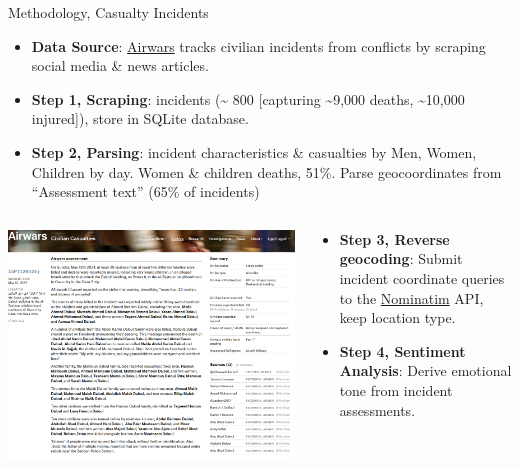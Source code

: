 \documentclass[
  ignorenonframetext,
]{beamer}
\providecommand{\tightlist}{%
  \setlength{\itemsep}{0pt}\setlength{\parskip}{0pt}}\usepackage{longtable,booktabs,array}
\begin{document}
\begin{frame}{Methodology, Casualty Incidents}
\label{methodology-casualty-incidents}
\begin{itemize}
\tightlist
\item
  \textbf{Data Source}:
  \href{https://airwars.org/conflict/israel-and-gaza-2023/}{Airwars}
  tracks civilian incidents from conflicts by scraping social media \&
  news articles.
\item
  \textbf{Step 1, Scraping}: incidents (\textasciitilde{} 800
  {[}capturing \textasciitilde9,000 deaths, \textasciitilde10,000
  injured{]}), store in SQLite database.
\item
  \textbf{Step 2, Parsing}: incident characteristics \& casualties by
  Men, Women, Children by day. Women \& children deaths, 51\%. Parse
  geocoordinates from ``Assessment text'' (65\% of incidents)
\end{itemize}

\begin{columns}[T]
\begin{column}{0.6\textwidth}
\includegraphics{images/airwars_incident_example.png}
\end{column}

\begin{column}{0.4\textwidth}
\begin{itemize}
\tightlist
\item
  \textbf{Step 3, Reverse geocoding}: Submit incident coordinate queries
  to the
  \href{https://nominatim.org/release-docs/develop/api/Reverse/}{Nominatim}
  API, keep location type.
\item
  \textbf{Step 4, Sentiment Analysis}: Derive emotional tone from
  incident assessments.


\end{itemize}
\end{column}
\end{columns}
\end{frame}
\end{document}
